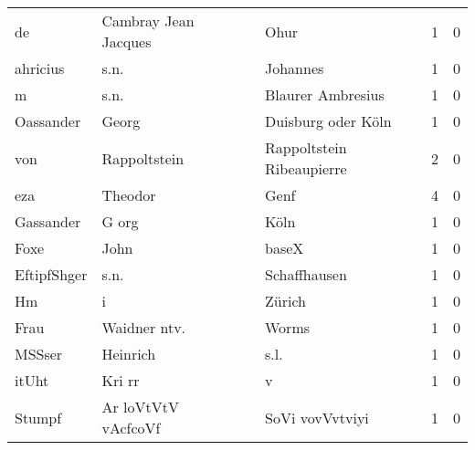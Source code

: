 \documentclass[10pt,a4paper,landscape]{article}
\begin{document}
\begin{longtable}{llllrr}
                       de &               Cambray Jean Jacques &             &                                        Ohur &          1 &         0 \\
                 ahricius &                               s.n. &             &                                    Johannes &          1 &         0 \\
                        m &                               s.n. &             &                           Blaurer Ambresius &          1 &         0 \\
                Oassander &                              Georg &             &                          Duisburg oder Köln &          1 &         0 \\
                      von &                       Rappoltstein &             &                   Rappoltstein Ribeaupierre &          2 &         0 \\
                      eza &                            Theodor &             &                                        Genf &          4 &         0 \\
                Gassander &                              G org &             &                                        Köln &          1 &         0 \\
                     Foxe &                               John &             &                                       baseX &          1 &         0 \\
              EftipfShger &                               s.n. &             &                                Schaffhausen &          1 &         0 \\
                       Hm &                                  i &             &                                      Zürich &          1 &         0 \\
                     Frau &                       Waidner ntv. &             &                                       Worms &          1 &         0 \\
                   MSSser &                           Heinrich &             &                                        s.l. &          1 &         0 \\
                    itUht &                             Kri rr &             &                                           v &          1 &         0 \\
                   Stumpf &                Ar loVtVtV vAcfcoVf &             &                             SoVi vovVvtviyi &          1 &         0 \\

\end{longtable}
\end{document}
